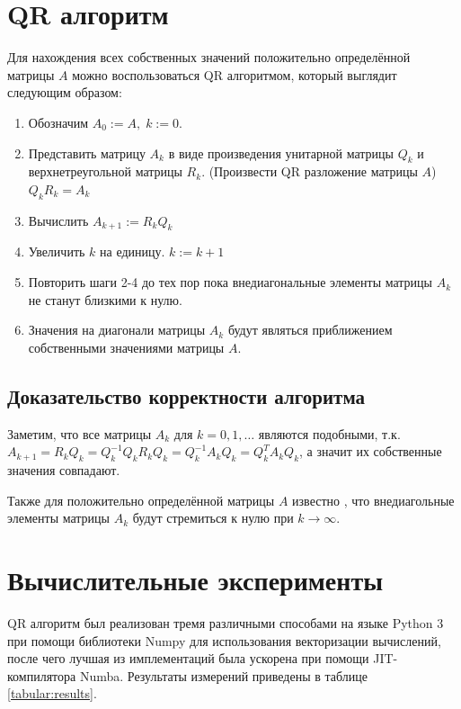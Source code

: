 \documentclass[12pt, fleqn]{article}
\begin{document}
\section{QR алгоритм}

Для нахождения всех собственных значений положительно определённой матрицы $A$ можно воспользоваться QR алгоритмом, который выглядит следующим образом:
\begin{enumerate}
	\item Обозначим $A_0 := A, \; k := 0$.
	\item Представить матрицу $A_k$ в виде произведения унитарной матрицы $Q_k$ и верхнетреугольной матрицы $R_k$. (Произвести QR разложение матрицы $A$) $Q_k R_k = A_k$
	\item Вычислить $A_{k+1} := R_k Q_k$
	\item Увеличить $k$ на единицу. $k := k + 1$
	\item Повторить шаги 2-4 до тех пор пока внедиагональные элементы матрицы $A_k$ не станут близкими к нулю.
	\item Значения на диагонали матрицы $A_k$ будут являться приближением собственными значениями матрицы $A$.
\end{enumerate}

\subsection{Доказательство корректности алгоритма}
Заметим, что все матрицы $A_k$ для $k = 0, 1, \dots$ являются подобными, т.к. \\
$A_{k + 1} = R_k Q_k = Q_k^{-1} Q_k R_k Q_k = Q_k^{-1} A_k Q_k = Q_k^T A_k Q_k$, а значит их собственные значения совпадают.

Также для положительно определённой матрицы $A$ известно \cite{QR}, что внедиагольные элементы матрицы $A_k$ будут стремиться к нулю при $k \to \infty$.

\section{Вычислительные эксперименты}

QR алгоритм был реализован тремя различными способами на языке Python 3 при помощи библиотеки Numpy для использования векторизации вычислений, после чего лучшая из имплементаций была ускорена при помощи JIT-компилятора Numba. Результаты измерений приведены в таблице \ref{tabular:results}.
\end{document}

